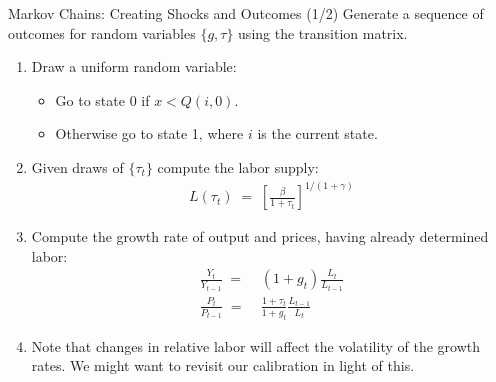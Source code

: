 \documentclass[10pt,c,aspectratio=1610,handout]{beamer}
\begin{document}
\begin{frame}{Markov Chains: Creating Shocks and Outcomes (1/2)}%
  Generate a sequence of outcomes for random variables $\{g,\tau\}$ using the transition matrix.%
  \begin{small}%
    \begin{enumerate}%
      \item Draw a uniform random variable:%
      \begin{itemize}%
        \item[$\rightarrow$] Go to state 0 if $x < Q(i,0)$.%
        \item[$\rightarrow$] Otherwise go to state 1, where $i$ is the current state.%
      \end{itemize}%
      \vspace*{0.1in}%
      \pause%
      \item Given draws of $\{\tau_t\}$ compute the labor supply:%
      \begin{align*}%
        L(\tau_t) \; = \; \left[ \frac{\beta}{1+\tau_t} \right]^{1/(1+\gamma)}%
      \end{align*}%
      \pause%
      \item Compute the growth rate of output and prices, having already determined labor:%
      \begin{align*}%
        \frac{Y_t}{Y_{t-1}} \; = & \; (1+g_t)\frac{L_t}{L_{t-1}}\\%
        \frac{P_t}{P_{t-1}} \; = & \; \frac{1+\tau_t}{1+g_t} \frac{L_{t-1}}{L_{t}}%
      \end{align*}%
      \pause%
      \item Note that changes in relative labor will affect the volatility of the growth rates. We might want to revisit our calibration in light of this.%
    \end{enumerate}%
  \end{small}%
\end{frame}%
\end{document}

